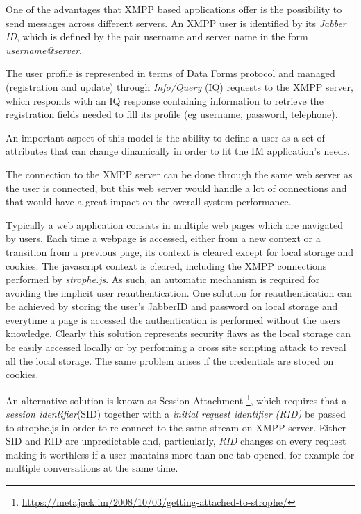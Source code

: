 {\color{blue}

    One of the advantages that \ac{XMPP} based applications offer is the possibility to send messages across different servers. An \ac{XMPP} user is identified by its \textit{Jabber ID}, which is defined by the pair username and server name in the form \textit{username@server}.

    The user profile is represented in terms of Data Forms\cite{xep0004} protocol and managed (registration and update) through \textit{Info/Query} (IQ) \cite{rfc3920} requests to the \ac{XMPP} server, which responds with an IQ response containing information to retrieve the registration fields needed to fill its profile (eg username, password, telephone). 
    
    An important aspect of this model is the ability to define a user as a set of attributes that can change dinamically in order to fit the \ac{IM} application's needs. 

    The connection to the \ac{XMPP} server can be done through the same web server as the user is connected, but this web server would handle a lot of connections and that would have a great impact on the overall system performance.

    Typically a web application consists in multiple web pages which are navigated by users. Each time a webpage is accessed, either from a new context or a transition from a previous page, its context is cleared except for local storage and cookies. The javascript context is cleared, including the \ac{XMPP} connections performed by \emph{strophe.js}. As such, an automatic mechanism is required for avoiding the implicit user reauthentication.
    One solution for reauthentication can be achieved by storing the user's JabberID and password on local storage and everytime a page is accessed the authentication is performed without the users knowledge. Clearly this solution represents security flaws as the local storage can be easily accessed locally or by performing a cross site scripting attack to reveal all the local storage. The same problem arises if the credentials are stored on cookies.

    An alternative solution is known as Session Attachment \footnote{\url{https://metajack.im/2008/10/03/getting-attached-to-strophe/}}, which requires that a \textit{session identifier}(SID) together with a \textit{initial request identifier (RID)} be passed to strophe.js in order to re-connect to the same stream on \ac{XMPP} server. Either SID and RID are unpredictable and, particularly, \textit{RID} changes on every request making it worthless if a user mantains more than one tab opened, for example for multiple conversations at the same time.
    
}
